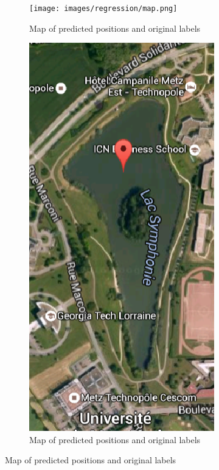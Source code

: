 \begin{figure}[!h]
\centering
\begin{subfigure}{0.5\textwidth}
\centering
\label{map}
\texttt{[image: images/regression/map.png]}
\caption{Map of predicted positions and original labels}
\end{subfigure}%
\begin{subfigure}{0.5\textwidth}
\centering
\label{lake}
\includegraphics[width=0.7\linewidth]{images/regression/lake.png}
\caption{Map of predicted positions and original labels}
\end{subfigure}
\end{figure}